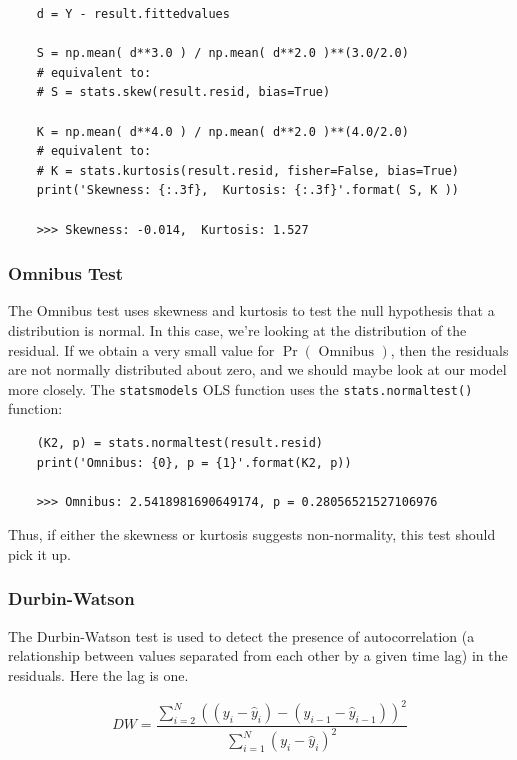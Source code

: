 \begin{lstlisting}
    d = Y - result.fittedvalues

    S = np.mean( d**3.0 ) / np.mean( d**2.0 )**(3.0/2.0)
    # equivalent to:
    # S = stats.skew(result.resid, bias=True)

    K = np.mean( d**4.0 ) / np.mean( d**2.0 )**(4.0/2.0)
    # equivalent to:
    # K = stats.kurtosis(result.resid, fisher=False, bias=True)
    print('Skewness: {:.3f},  Kurtosis: {:.3f}'.format( S, K ))

    >>> Skewness: -0.014,  Kurtosis: 1.527
\end{lstlisting}

\subsubsection{Omnibus Test}

The Omnibus test uses skewness and kurtosis to test the null hypothesis that a distribution is normal. In this case, we’re looking at the distribution of the residual. If we obtain a very small value for $\Pr( \mbox{ Omnibus } )$, then the residuals are not normally distributed about zero, and we should maybe look at our model more closely. The \lstinline{statsmodels} OLS function uses the \lstinline{stats.normaltest()} function:

\begin{lstlisting}
    (K2, p) = stats.normaltest(result.resid)
    print('Omnibus: {0}, p = {1}'.format(K2, p))

    >>> Omnibus: 2.5418981690649174, p = 0.28056521527106976
\end{lstlisting}

Thus, if either the skewness or kurtosis suggests non-normality, this test should pick it up.

\subsubsection{Durbin-Watson}

The Durbin-Watson test is used to detect the presence of autocorrelation (a relationship between values separated from each other by a given time lag) in the residuals. Here the lag is one.

\begin{equation}
 DW = \dfrac{ \displaystyle \sum_{i=2}^{N} ( ( y_{i} - \hat{y}_i ) - ( y_{i-1} - \hat{y}_{i-1} ) )^{2} }{ \displaystyle \sum_{i=1}^{N} ( y_{i} - \hat{y}_{i} )^{2}}
 \end{equation}

